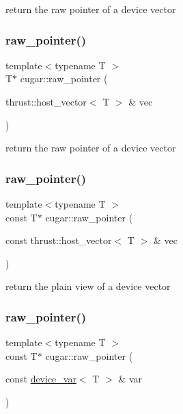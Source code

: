return the raw pointer of a device vector \mbox{\label{namespacecugar_a3887e33637b5ebf98a3d9b81b806571c}} 
\subsubsection{\texorpdfstring{raw\+\_\+pointer()}{raw\_pointer()}\hspace{0.1cm}{\footnotesize\ttfamily [3/6]}}
{\footnotesize\ttfamily template$<$typename T $>$ \\
T$\ast$ cugar\+::raw\+\_\+pointer (\begin{DoxyParamCaption}\item[{thrust\+::host\+\_\+vector$<$ T $>$ \&}]{vec }\end{DoxyParamCaption})}

return the raw pointer of a device vector \mbox{\label{namespacecugar_abb8f6f9017ebeaf8886659425e9a0d11}} 
\subsubsection{\texorpdfstring{raw\+\_\+pointer()}{raw\_pointer()}\hspace{0.1cm}{\footnotesize\ttfamily [4/6]}}
{\footnotesize\ttfamily template$<$typename T $>$ \\
const T$\ast$ cugar\+::raw\+\_\+pointer (\begin{DoxyParamCaption}\item[{const thrust\+::host\+\_\+vector$<$ T $>$ \&}]{vec }\end{DoxyParamCaption})}

return the plain view of a device vector \mbox{\label{namespacecugar_a7edcd356c9e90087a3b1100eec65438a}} 
\subsubsection{\texorpdfstring{raw\+\_\+pointer()}{raw\_pointer()}\hspace{0.1cm}{\footnotesize\ttfamily [5/6]}}
{\footnotesize\ttfamily template$<$typename T $>$ \\
const T$\ast$ cugar\+::raw\+\_\+pointer (\begin{DoxyParamCaption}\item[{const \hyperlink{structcugar_1_1device__var}{device\+\_\+var}$<$ T $>$ \&}]{var }\end{DoxyParamCaption})}

